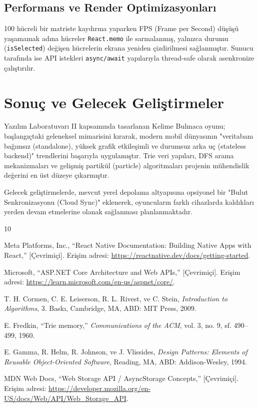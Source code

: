 \documentclass[conference,a4paper]{IEEEtran}
\begin{document}
\subsection{Performans ve Render Optimizasyonları}
100 hücreli bir matriste kaydırma yaparken FPS (Frame per Second) düşüşü yaşamamak adına hücreler \texttt{React.memo} ile sarmalanmış, yalnızca durumu (\texttt{isSelected}) değişen hücrelerin ekrana yeniden çizdirilmesi sağlanmıştır. Sunucu tarafında ise API istekleri \texttt{async/await} yapılarıyla thread-safe olarak asenkronize çalıştırılır.

\section{Sonuç ve Gelecek Geliştirmeler}
Yazılım Laboratuvarı II kapsamında tasarlanan Kelime Bulmaca oyunu; başlangıçtaki geleneksel mimarisini kırarak, modern mobil dünyasının "veritabanı bağımsız (standalone), yüksek grafik etkileşimli ve durumsuz arka uç (stateless backend)" trendlerini başarıyla uygulamıştır. Trie veri yapıları, DFS arama mekanizmaları ve gelişmiş partikül (particle) algoritmaları projenin mühendislik değerini en üst düzeye çıkarmıştır.

Gelecek geliştirmelerde, mevcut yerel depolama altyapısına opsiyonel bir "Bulut Senkronizasyonu (Cloud Sync)" eklenerek, oyuncuların farklı cihazlarda kaldıkları yerden devam etmelerine olanak sağlanması planlanmaktadır.

\vspace{1cm}

\begin{thebibliography}{10}

Meta Platforms, Inc., ``React Native Documentation: Building Native Apps with React,'' [Çevrimiçi]. Erişim adresi: \url{https://reactnative.dev/docs/getting-started}.

Microsoft, ``ASP.NET Core Architecture and Web APIs,'' [Çevrimiçi]. Erişim adresi: \url{https://learn.microsoft.com/en-us/aspnet/core/}.

T. H. Cormen, C. E. Leiserson, R. L. Rivest, ve C. Stein, \textit{Introduction to Algorithms}, 3. Baskı, Cambridge, MA, ABD: MIT Press, 2009.

E. Fredkin, ``Trie memory,'' \textit{Communications of the ACM}, vol. 3, no. 9, sf. 490--499, 1960.

E. Gamma, R. Helm, R. Johnson, ve J. Vlissides, \textit{Design Patterns: Elements of Reusable Object-Oriented Software}, Reading, MA, ABD: Addison-Wesley, 1994.

MDN Web Docs, ``Web Storage API / AsyncStorage Concepts,'' [Çevrimiçi]. Erişim adresi: \url{https://developer.mozilla.org/en-US/docs/Web/API/Web_Storage_API}.

\end{thebibliography}
\end{document}
